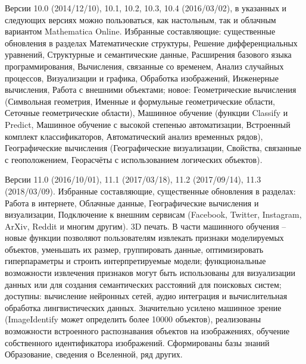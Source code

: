 \begin{textitemize}
	\item Версии 10.0 (2014/12/10), 10.1, 10.2, 10.3, 10.4 (2016/03/02), в указанных и следующих версиях можно пользоваться, как настольным, так и облачным вариантом Mathematica Online. Избранные составляющие: существенные обновления в разделах Математические структуры, Решение дифференциальных уравнений, Структурные и семантические данные, Расширения базового языка программирования, Вычисления, связанные со временем, Анализ случайных процессов, Визуализации и графика, Обработка изображений, Инженерные вычисления, Работа с внешними объектами; новое: Геометрические вычисления (Символьная геометрия, Именные и формульные геометрические области, Сеточные геометрические области), Машинное обучение (функции Classify и Predict, Машинное обучение с высокой степенью автоматизации, Встроенный комплект классификаторов, Автоматический анализ временных рядов), Географические вычисления (Географические визуализации, Свойства, связанные с геоположением, Георасчёты с использованием логических объектов).
	\item Версии 11.0 (2016/10/01), 11.1 (2017/03/18), 11.2 (2017/09/14), 11.3 (2018/03/09). Избранные составляющие, существенные обновления в разделах: Работа в интернете, Облачные данные, Географические вычисления и визуализации, Подключение к внешним сервисам (Facebook, Twitter, Instagram, ArXiv, Reddit и многим другим). 3D печать. В части машинного обучения -- новые функции позволяют пользователям извлекать признаки моделируемых объектов, уменьшать их размер, группировать данные, оптимизировать гиперпараметры и строить интерпретируемые модели; функциональные возможности извлечения признаков могут быть использованы для визуализации данных или для создания семантических расстояний для поисковых систем; доступны: вычисление нейронных сетей, аудио интеграция и вычислительная обработка лингвистических данных. Значительно усилено машинное зрение (ImageIdentify может определить более 10000 объектов), реализованы возможности встроенного распознавания объектов на изображениях, обучение собственного идентификатора изображений. Сформированы базы знаний Образование, сведения о Вселенной, ряд других. 

\end{textitemize}
